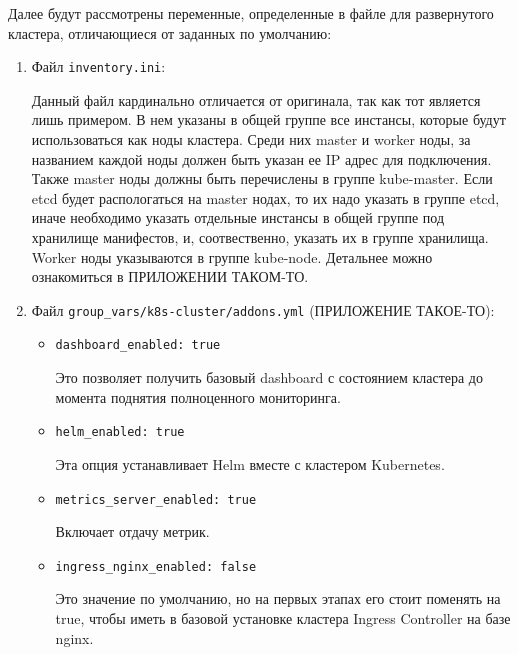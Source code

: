 Далее будут рассмотрены переменные, определенные в файле для развернутого кластера, отличающиеся от заданных по умолчанию:
\begin{enumerate}
    \item Файл \texttt{inventory.ini}:

        Данный файл кардинально отличается от оригинала, так как тот является лишь примером. В нем указаны в общей группе все инстансы, которые будут использоваться как ноды кластера. Среди них master 
        и worker
        ноды, за названием каждой ноды должен быть указан ее IP
        адрес для подключения. Также master ноды должны быть перечислены в группе kube-master. Если etcd
        будет распологаться на master нодах, то их надо указать в группе etcd, иначе необходимо указать отдельные инстансы в общей группе под хранилище манифестов, и, соотвественно, указать их в группе хранилища. Worker ноды указываются в группе kube-node. Детальнее можно ознакомиться в ПРИЛОЖЕНИИ ТАКОМ-ТО.

    \item Файл \texttt{group\_vars/k8s-cluster/addons.yml} (ПРИЛОЖЕНИЕ ТАКОЕ-ТО):
        \begin{itemize}
            \item \texttt{dashboard\_enabled: true}

                Это позволяет получить базовый dashboard
                с состоянием кластера до момента поднятия полноценного мониторинга.

            \item \texttt{helm\_enabled: true}

                Эта опция устанавливает Helm
                вместе с кластером Kubernetes.

            \item \texttt{metrics\_server\_enabled: true}

                Включает отдачу метрик.

            \item \texttt{ingress\_nginx\_enabled: false}

                Это значение по умолчанию, но на первых этапах его стоит поменять на true, чтобы иметь в базовой установке кластера Ingress Controller
                на базе nginx.


\end{itemize}
\end{enumerate}

